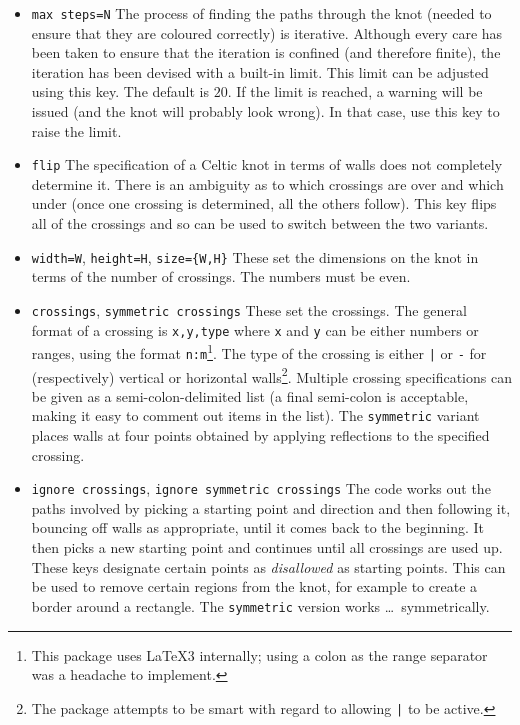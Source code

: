 \documentclass{ltxdoc}
\begin{document}
\begin{itemize}
\item \Verb+max steps=N+ The process of finding the paths through the knot (needed to ensure that they are coloured correctly) is iterative.
Although every care has been taken to ensure that the iteration is confined (and therefore finite), the iteration has been devised with a built-in limit.
This limit can be adjusted using this key.
The default is \(20\).
If the limit is reached, a warning will be issued (and the knot will probably look wrong).
In that case, use this key to raise the limit.

\item \Verb+flip+ The specification of a Celtic knot in terms of walls does not completely determine it.
There is an ambiguity as to which crossings are over and which under (once one crossing is determined, all the others follow).
This key flips all of the crossings and so can be used to switch between the two variants.

\item \Verb+width=W+, \Verb+height=H+, \Verb+size={W,H}+ These set the dimensions on the knot in terms of the number of crossings.
The numbers must be even.

\item \Verb+crossings+, \Verb+symmetric crossings+ These set the crossings.
The general format of a crossing is \Verb+x,y,type+ where \Verb+x+ and \Verb+y+ can be either numbers or ranges, using the format \Verb+n:m+\footnote{This package uses \LaTeX3 internally; using a colon as the range separator was a headache to implement.}.
The type of the crossing is either \Verb+|+ or \Verb+-+ for (respectively) vertical or horizontal walls\footnote{The package attempts to be smart with regard to allowing \Verb+|+ to be active.}.
Multiple crossing specifications can be given as a semi-colon-delimited list (a final semi-colon is acceptable, making it easy to comment out items in the list).
The \Verb+symmetric+ variant places walls at four points obtained by applying reflections to the specified crossing.

\item \Verb+ignore crossings+, \Verb+ignore symmetric crossings+ The code works out the paths involved by picking a starting point and direction and then following it, bouncing off walls as appropriate, until it comes back to the beginning.
It then picks a new starting point and continues until all crossings are used up.
These keys designate certain points as \emph{disallowed} as starting points.
This can be used to remove certain regions from the knot, for example to create a border around a rectangle.
The \Verb+symmetric+ version works \dots\ symmetrically.


\end{itemize}
\end{document}
